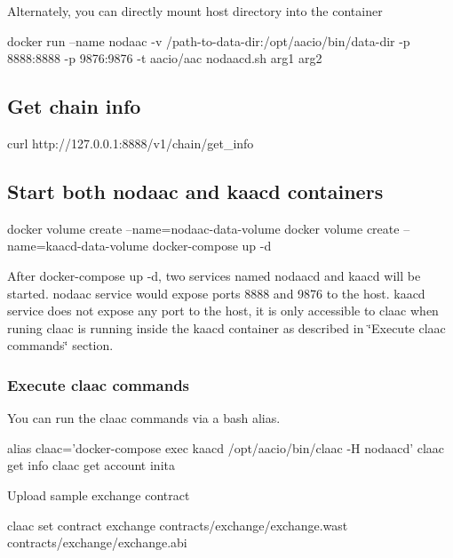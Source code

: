 Alternately, you can directly mount host directory into the container 
\begin{DoxyCode}
docker run --name nodaac -v /path-to-data-dir:/opt/aacio/bin/data-dir -p 8888:8888 -p 9876:9876 -t
       aacio/aac nodaacd.sh arg1 arg2
\end{DoxyCode}


\subsection*{Get chain info}


\begin{DoxyCode}
curl http://127.0.0.1:8888/v1/chain/get\_info
\end{DoxyCode}


\subsection*{Start both nodaac and kaacd containers}


\begin{DoxyCode}
docker volume create --name=nodaac-data-volume
docker volume create --name=kaacd-data-volume
docker-compose up -d
\end{DoxyCode}


After {\ttfamily docker-\/compose up -\/d}, two services named {\ttfamily nodaacd} and {\ttfamily kaacd} will be started. nodaac service would expose ports 8888 and 9876 to the host. kaacd service does not expose any port to the host, it is only accessible to claac when runing claac is running inside the kaacd container as described in \char`\"{}\+Execute claac commands\char`\"{} section.

\subsubsection*{Execute claac commands}

You can run the {\ttfamily claac} commands via a bash alias.


\begin{DoxyCode}
alias claac='docker-compose exec kaacd /opt/aacio/bin/claac -H nodaacd'
claac get info
claac get account inita
\end{DoxyCode}


Upload sample exchange contract


\begin{DoxyCode}
claac set contract exchange contracts/exchange/exchange.wast contracts/exchange/exchange.abi
\end{DoxyCode}


